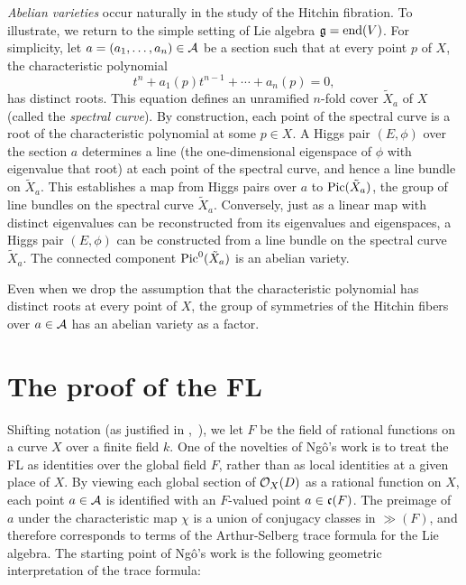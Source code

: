 {\it Abelian varieties} occur naturally in the study of the Hitchin
fibration.  To illustrate, we return to the simple setting of Lie
algebra $\gg=\op{end}(V)$.  For simplicity, let $a=(a_1,\ldots,a_n)\in
\AA$ be a section such that at every point $p$ of $X$, the characteristic
polynomial 
\begin{equation}\label{eqn:spectral}
t^n + a_1(p) t^{n-1} + \cdots+ a_n(p)=0,
\end{equation} 
has distinct roots.  This equation defines an unramified $n$-fold
cover $\tilde X_a$ of $X$ (called the {\it spectral curve}).  By
construction, each point of the spectral curve is a root of the
characteristic polynomial at some $p\in X$.  A Higgs pair $(E,\phi)$
over the section $a$ determines a line (the one-dimensional eigenspace
of $\phi$ with eigenvalue that root) at each point of the spectral curve,
and hence a line bundle on $\tilde X_a$.  This establishes a map from
Higgs pairs over $a$ to $\op{Pic}(\tilde X_a)$, the group of line
bundles on the spectral curve $\tilde X_a$.  Conversely, just as a
linear map with distinct eigenvalues can be reconstructed from its
eigenvalues and eigenspaces, a Higgs pair $(E,\phi)$ can be
constructed from a line bundle on the spectral curve $\tilde X_a$.
The connected component $\op{Pic}^0(\tilde X_a)$ is an abelian
variety.

Even when we drop the assumption that the characteristic polynomial
has distinct roots at every point of $X$, the group of symmetries of
the Hitchin fibers over $a\in\AA$ has an abelian
variety as a factor.


\section{The proof of the FL}

Shifting notation (as justified in \cite{Wald:2006},~\cite{CHL:2010}),
we let $F$ be the field of rational functions on a curve $X$ over a
finite field $k$.  One of the novelties of Ng\^o's work is to treat
the FL as identities over the global field $F$, rather than as local
identities at a given place of $X$.
By viewing each global section of $\OO_X(D)$ as a
rational function on $X$, each point $a\in{\AA}$ is identified with an
$F$-valued point $a\in \cc(F)$.  The preimage of $a$ under the
characteristic map $\chi$ is a union of conjugacy classes in $\gg(F)$,
and therefore corresponds to terms of the Arthur-Selberg trace formula
for the Lie algebra.  The starting point of Ng\^o's work is the
following geometric interpretation of the trace formula:

